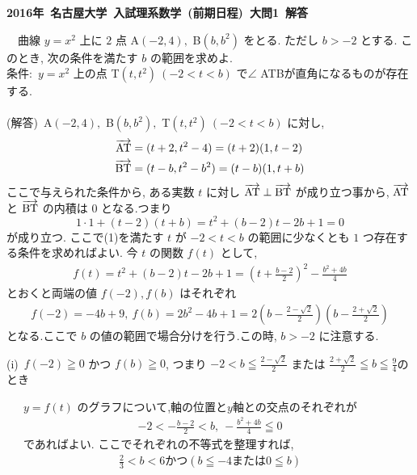 \documentclass[a4j,12pt]{jarticle}
\newcommand{\vto}[1]{\overrightarrow{#1}}
\begin{document}
\begin{center}
\bf{\Large 2016年~名古屋大学~入試理系数学~(前期日程)~大問1~解答}
\end{center}
　曲線 $y=x^2$ 上に $2$ 点 A$(-2, 4),$ B$(b, b^2)$ をとる.
ただし $b > -2$ とする.
このとき, 次の条件を満たす $b$ の範囲を求めよ.\\
条件:~$y=x^2$ 上の点 T$(t, t^2)~(-2<t<b)$ で$\angle$ ATBが直角になるものが存在する.\\
\hrulefill
\\
(解答)~A$(-2, 4),$ B$(b, b^2),$ T$(t, t^2)~(-2<t<b)$ に対し,
  \begin{align*}
    \vto{\rm{AT}} &= (t+2, t^2-4) = (t+2)(1, t-2)\\
    \vto{\rm{BT}} &= (t-b, t^2-b^2) = (t-b)(1, t+b)
  \end{align*}
  ここで与えられた条件から,
  ある実数 $t$ に対し $\vto{\rm{AT}} \perp \vto{\rm{BT}}$ が成り立つ事から,
  $\vto{\rm{AT}}$ と $\vto{\rm{BT}}$ の内積は $0$ となる.つまり
  \begin{equation}
    1 \cdot 1 + (t-2)(t+b) = t^2 + (b-2)t -2b+1 = 0
  \end{equation}
  が成り立つ.
  ここで(1)を満たす $t$ が $-2<t<b$ の範囲に少なくとも $1$ つ存在する条件を求めればよい.
  今 $t$ の関数 $f(t)$ として,
  \begin{align*}
   f(t) = t^2 + (b-2)t -2b+1 =\left( t + \frac{b-2}{2} \right)^2 - \frac{b^2+4b}{4}
  \end{align*}
  とおくと両端の値 $f(-2),f(b)$ はそれぞれ
   \begin{align*}
    f(-2) = -4b + 9,~
    f(b) = 2b^2 -4b +1 = 2 \left( b - \frac{2-\sqrt{2}}{2} \right)\left( b - \frac{2+\sqrt{2}}{2} \right)
  \end{align*}
  となる.ここで $b$ の値の範囲で場合分けを行う.この時, $b>-2$ に注意する.
  \begin{flushleft}
    (i)~$f(-2) \geqq 0$ かつ $f(b) \geqq 0$,
    つまり $-2 < b \leqq \frac{2-\sqrt{2}}{2}$
    または $\frac{2+\sqrt{2}}{2} \leqq b \leqq \frac{9}{4}$のとき
  \end{flushleft}
  　~$y=f(t)$ のグラフについて,軸の位置と$y$軸との交点のそれぞれが 
  \begin{align*}
    -2 < - \frac{b-2}{2} < b,~
    - \frac{b^2+4b}{4} \leqq 0
  \end{align*}
  　~であればよい.
  ここでそれぞれの不等式を整理すれば,
  \begin{align*}
    \frac{2}{3} < b < 6 かつ( b \leqq -4 または 0 \leqq b)
  \end{align*}
\end{document}
